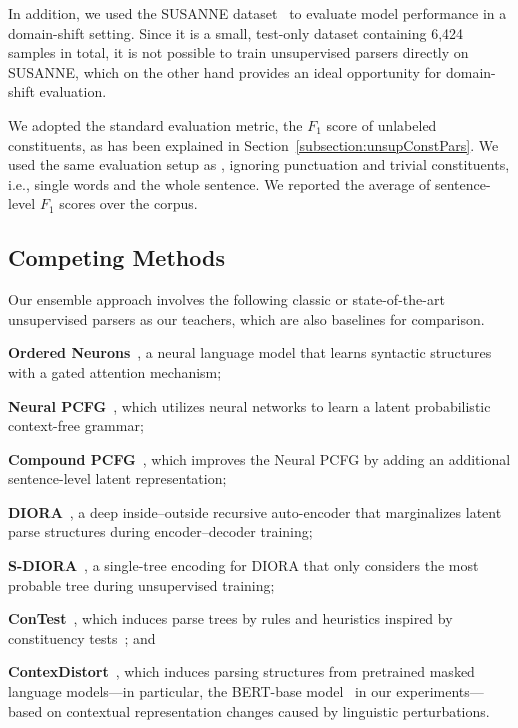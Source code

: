 \documentclass{article}
\begin{document}
In addition, we used the SUSANNE dataset~\citep{SusanneCorpus} to evaluate model performance in a domain-shift setting. Since it is a small, test-only dataset containing 6,424 samples in total, it is not possible to train unsupervised parsers directly on SUSANNE, which on the other hand provides an ideal opportunity for domain-shift evaluation.

We adopted the standard evaluation metric, the $F_1$ score of unlabeled constituents, as has been explained in Section~\ref{subsection:unsupConstPars}. We used the same evaluation setup as \citet{kim-etal-2019-compound}, ignoring punctuation and trivial constituents, i.e., single words and the whole sentence. We reported the average of sentence-level $F_1$ scores over the corpus.

\subsection{Competing Methods}

Our ensemble approach involves the following classic or state-of-the-art unsupervised parsers as our teachers, which are also baselines for comparison.

\begin{compactitem}[\quad$\bullet$]
\item \textbf{Ordered Neurons}~\citep{shen2018ordered}, a neural language model that learns syntactic structures with a gated attention mechanism;

\item \textbf{Neural PCFG}~\citep{kim-etal-2019-compound}, which utilizes neural networks to learn a latent probabilistic context-free grammar;

\item \textbf{Compound PCFG}~\citep{kim-etal-2019-compound}, which improves the Neural PCFG by adding an additional sentence-level latent representation;

\item \textbf{DIORA}~\citep{drozdov-etal-2019-unsupervised-latent}, a deep inside--outside recursive auto-encoder that 
marginalizes latent parse structures during encoder--decoder training;

\item \textbf{S-DIORA}~\citep{drozdov2020diora}, a single-tree encoding for DIORA that only considers the most probable tree during unsupervised training;

\item \textbf{ConTest}~\citep{cao-etal-2020-unsupervised}, which induces parse trees by rules and heuristics inspired by constituency tests~\citep{mccawley1998syntactic}; and

\item \textbf{ContexDistort}~\citep{li-lu-2023-contextual}, which induces parsing structures from pretrained masked language models---in particular, the BERT-base model~\citep{devlin-etal-2019-bert} in our experiments---based on contextual representation changes caused by linguistic perturbations.
\end{compactitem}
\end{document}
